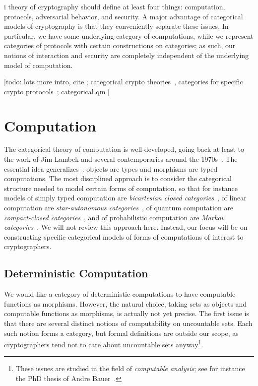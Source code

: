 i theory of cryptography should define at least four things: computation,
protocols, adversarial behavior, and security. A major advantage of categorical
models of cryptography is that they conveniently separate these issues. In
particular, we have some underlying category of computations, while we represent
categories of protocols with certain constructions on categories; as such, our
notions of interaction and security are completely independent of the underlying
model of computation.

[todo: lots more intro,
cite \cite{broadbent-karvonen-2022};
categorical crypto theories~\cite{hines-2020,pavlovic-2012,pavlovic-2014,stay-vicary-2013},
categories for specific crypto protocols~\cite{bkm-2019, bmr-2019}; categorical
qm
\cite{abramsky-coecke-2004,coecke-perdrix-2012,heunen-vicary-2014,coecke-kissinger-2017,chitambar-gour-2019}]

\section{Computation}
\label{sec:computation}

The categorical theory of computation is well-developed, going back at least to
the work of Jim Lambek and several contemporaries around the
1970s~\cite{lambeck-1974,lambeck-1980,lawvere-1969,seely-1984}. The essential
idea generalizes~: objects are types
and morphisms are typed computations. The most disciplined approach is to
consider the categorical structure needed to model certain forms of computation, so that
for instance models of simply typed computation are \emph{bicartesian closed
categories}~\cite{lambeck-1974}, of linear computation are \emph{star-autonomous
categories}~\cite{seely-1989}, of quantum computation are \emph{compact-closed
categories}~\cite{abramsky-coecke-2004}, and of probabilistic computation are \emph{Markov
categories}~\cite{fritz-2020}. We will not review this approach here. Instead,
our focus will be on constructing specific categorical models of forms of
computations of interest to cryptographers.

\subsection{Deterministic Computation}

We would like a category of deterministic computations to have computable
functions as morphisms. However, the natural choice, taking sets as objects and
computable functions as morphisms, is actually not yet precise. The first issue
is that there are several distinct notions of computability on uncountable sets.
Each such notion forms a category, but formal definitions are outside our scope,
as cryptographers tend not to care about uncountable sets anyway\footnote{These
issues are studied in the field of \emph{computable analysis}; see for instance
the PhD thesis of Andre Bauer~\cite{bauer-2000}.}.

